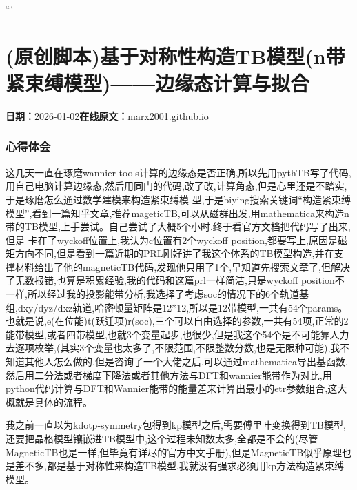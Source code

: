 \documentclass[lang=cn,scheme=chinese,color=blue,device=normal,toc=onecol,math=cm]{elegantbook}
\begin{document}
```\par



\section{(原创脚本)基于对称性构造TB模型(n带紧束缚模型)——边缘态计算与拟合}
\begin{articlemeta}
\textbf{日期：}2026-01-02\hfill\textbf{在线原文：}\href{https://marx2001.github.io/sci-note\_posts/20260102-MagneticTB}{marx2001.github.io}
\end{articlemeta}

\subsubsection{心得体会}


这几天一直在琢磨wannier tools计算的边缘态是否正确,所以先用pythTB写了代码,用自己电脑计算边缘态,然后用同门的代码,改了改,计算角态,但是心里还是不踏实,于是琢磨怎么通过数学建模来构造紧束缚模 型,于是biying搜索关键词“构造紧束缚模型”,看到一篇知乎文章,推荐mageticTB,可以从磁群出发,用mathematica来构造n带的TB模型,上手尝试。自己尝试了大概5个小时,终于看官方文档把代码写了出来,但是 卡在了wyckoff位置上,我认为c位置有2个wyckoff position,都要写上,原因是磁矩方向不同,但是看到一篇近期的PRL刚好讲了我这个体系的TB模型构造,并在支撑材料给出了他的magneticTB代码,发现他只用了1个,早知道先搜索文章了,但解决了无数报错,也算是积累经验,我的代码和这篇prl一样简洁,只是wyckoff position不一样,所以经过我的投影能带分析,我选择了考虑soc的情况下的6个轨道基组,dxy/\allowbreak{}dyz/\allowbreak{}dxz轨道,哈密顿量矩阵是12*12,所以是12带模型,一共有54个params。也就是说,e(在位能)t(跃迁项)r(soc),三个可以自由选择的参数,一共有54项,正常的2能带模型,或者四带模型,也就3个变量起步,也很少,但是我这个54个是不可能靠人力去逐项枚举,(其实3个变量也太多了,不限范围,不限整数分数,也是无限种可能),我不知道其他人怎么做的,但是咨询了一个大佬之后,可以通过mathematica导出基函数,然后用二分法或者梯度下降法或者其他方法与DFT和wannier能带作为对比,用python代码计算与DFT和Wannier能带的能量差来计算出最小的etr参数组合,这大概就是具体的流程。\par


我之前一直以为kdotp-symmetry包得到kp模型之后,需要傅里叶变换得到TB模型,还要把晶格模型镶嵌进TB模型中,这个过程未知数太多,全都是不会的(尽管MagneticTB也是一样,但毕竟有详尽的官方中文手册),但是MagneticTB似乎原理也是差不多,都是基于对称性来构造TB模型,我就没有强求必须用kp方法构造紧束缚模型。\par
\end{document}
